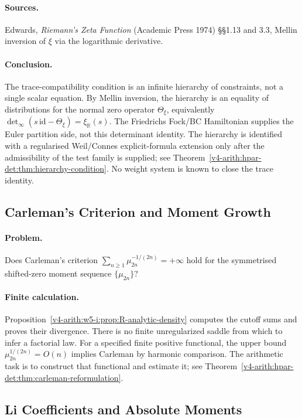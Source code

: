 \paragraph{Sources.} Edwards, \emph{Riemann's Zeta Function}
(Academic Press 1974) \S\S1.13 and 3.3, Mellin inversion of \(\xi\)
via the logarithmic derivative.

\paragraph{Conclusion.} The trace-compatibility
condition is an infinite hierarchy of constraints, not a single
scalar equation. By Mellin inversion, the hierarchy is an equality of distributions for the normal zero
operator \(\Theta_{\xi}\), equivalently
\(\det_{\infty}(s\,\mathrm{id}-\Theta_{\xi})=\xi_{\mathbb R}(s)\). The
Friedrichs Fock/BC Hamiltonian supplies the Euler partition side, not
this determinant identity. The hierarchy is identified with a regularised
Weil/Connes explicit-formula extension only after the admissibility of the
test family is supplied; see
Theorem~\ref{v4-arith:hpar-det:thm:hierarchy-condition}. No weight system is
known to close the trace identity.

\subsection{Carleman's Criterion and Moment Growth}
\label{v4-arith:hpar-det:cycle-4}

\paragraph{Problem.} Does Carleman's criterion
\(\sum_{n\geq 1}\mu_{2n}^{-1/(2n)}=+\infty\) hold for the
symmetrised shifted-zero moment sequence \(\{\mu_{2n}\}\)?

\paragraph{Finite calculation.} Proposition~\ref{v4-arith:w5-i:prop:R-analytic-density}
computes the cutoff sums and proves their divergence. There is no
finite unregularized saddle from which to infer a factorial law.
For a specified finite positive functional, the upper bound
\(\mu_{2n}^{1/(2n)}=O(n)\) implies Carleman by harmonic comparison.
The arithmetic task is to construct that functional and estimate it;
see Theorem~\ref{v4-arith:hpar-det:thm:carleman-reformulation}.

\subsection{Li Coefficients and Absolute Moments}
\label{v4-arith:hpar-det:cycle-5}

